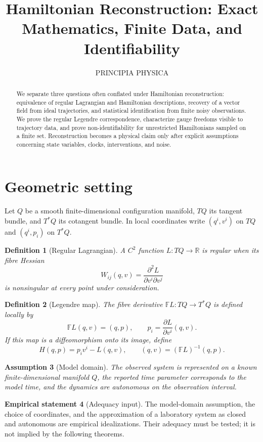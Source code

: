 \documentclass[12pt]{article}
\title{Hamiltonian Reconstruction: Exact Mathematics, Finite Data, and Identifiability}
\author{PRINCIPIA PHYSICA}
\date{}
\newtheorem{definition}{Definition}[section]
\newtheorem{assumption}[definition]{Assumption}
\theoremstyle{definition}
\newtheorem{empirical}[definition]{Empirical statement}
\begin{document}
\maketitle
\begin{abstract}
We separate three questions often conflated under Hamiltonian reconstruction: equivalence of regular Lagrangian and Hamiltonian descriptions, recovery of a vector field from ideal trajectories, and statistical identification from finite noisy observations. We prove the regular Legendre correspondence, characterize gauge freedoms visible to trajectory data, and prove non-identifiability for unrestricted Hamiltonians sampled on a finite set. Reconstruction becomes a physical claim only after explicit assumptions concerning state variables, clocks, interventions, and noise.
\end{abstract}

\section{Geometric setting}
Let $Q$ be a smooth finite-dimensional configuration manifold, $TQ$ its tangent bundle, and $T^*Q$ its cotangent bundle. In local coordinates write $(q^i,v^i)$ on $TQ$ and $(q^i,p_i)$ on $T^*Q$.

\begin{definition}[Regular Lagrangian]
A $C^2$ function $L:TQ\to\mathbb R$ is \emph{regular} when its fibre Hessian
\[
W_{ij}(q,v)=\frac{\partial^2L}{\partial v^i\partial v^j}
\]
is nonsingular at every point under consideration.
\end{definition}

\begin{definition}[Legendre map]
The fibre derivative $\mathbb FL:TQ\to T^*Q$ is defined locally by
\[
\mathbb FL(q,v)=(q,p),\qquad p_i=\frac{\partial L}{\partial v^i}(q,v).
\]
If this map is a diffeomorphism onto its image, define
\[
H(q,p)=p_iv^i-L(q,v),\qquad (q,v)=(\mathbb FL)^{-1}(q,p).
\]
\end{definition}

\begin{assumption}[Model domain]
The observed system is represented on a known finite-dimensional manifold $Q$, the reported time parameter corresponds to the model time, and the dynamics are autonomous on the observation interval.
\end{assumption}

\begin{empirical}[Adequacy input]
The model-domain assumption, the choice of coordinates, and the approximation of a laboratory system as closed and autonomous are empirical idealizations. Their adequacy must be tested; it is not implied by the following theorems.
\end{empirical}
\end{document}
